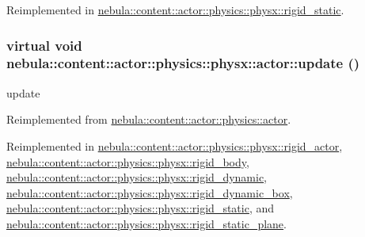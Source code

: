 Reimplemented in \hyperlink{classnebula_1_1content_1_1actor_1_1physics_1_1physx_1_1rigid__static_a88451f898907fcda24ff6cfeefb1b79c}{nebula::content::actor::physics::physx::rigid\_\-static}.\hypertarget{classnebula_1_1content_1_1actor_1_1physics_1_1physx_1_1actor_a16da3f8769e927a8fe9ae353aa8411af}{
\subsubsection[{update}]{\setlength{\rightskip}{0pt plus 5cm}virtual void nebula::content::actor::physics::physx::actor::update ()}}
\label{classnebula_1_1content_1_1actor_1_1physics_1_1physx_1_1actor_a16da3f8769e927a8fe9ae353aa8411af}


update 

Reimplemented from \hyperlink{classnebula_1_1content_1_1actor_1_1physics_1_1actor_a7b7a1ee3673ad9f618a20e327e1a974c}{nebula::content::actor::physics::actor}.

Reimplemented in \hyperlink{classnebula_1_1content_1_1actor_1_1physics_1_1physx_1_1rigid__actor_a72b8760ff690a21d9e248c0fe63baed4}{nebula::content::actor::physics::physx::rigid\_\-actor}, \hyperlink{classnebula_1_1content_1_1actor_1_1physics_1_1physx_1_1rigid__body_a4bd2572632f4e23314db0857e52b079c}{nebula::content::actor::physics::physx::rigid\_\-body}, \hyperlink{classnebula_1_1content_1_1actor_1_1physics_1_1physx_1_1rigid__dynamic_a4687fa4b706a0adf0b733ff199bd0d25}{nebula::content::actor::physics::physx::rigid\_\-dynamic}, \hyperlink{classnebula_1_1content_1_1actor_1_1physics_1_1physx_1_1rigid__dynamic__box_af0b2a118a005904df613fa771c55da93}{nebula::content::actor::physics::physx::rigid\_\-dynamic\_\-box}, \hyperlink{classnebula_1_1content_1_1actor_1_1physics_1_1physx_1_1rigid__static_ada05e897e2f4dd915f525893fc027f39}{nebula::content::actor::physics::physx::rigid\_\-static}, and \hyperlink{classnebula_1_1content_1_1actor_1_1physics_1_1physx_1_1rigid__static__plane_a1f3ad3d71a0828a841901a7e69cbbe97}{nebula::content::actor::physics::physx::rigid\_\-static\_\-plane}.


